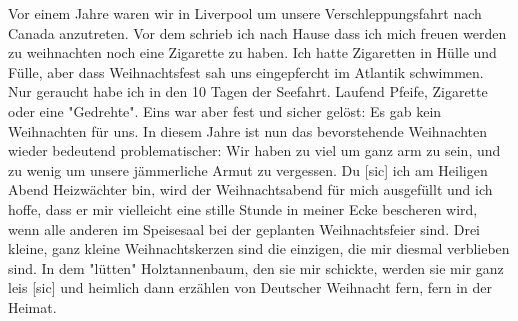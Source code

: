 \def\day{22. 12. 1942. *}
\mktitle

Vor einem Jahre waren wir in Liverpool um unsere Verschleppungsfahrt nach Canada anzutreten.
Vor dem schrieb ich nach Hause dass ich mich freuen werden zu weihnachten noch eine Zigarette zu haben.
Ich hatte Zigaretten in H\"{u}lle und F\"{u}lle, aber dass Weihnachtsfest sah uns eingepfercht im Atlantik schwimmen.
Nur geraucht habe ich in den 10 Tagen der Seefahrt.
Laufend Pfeife, Zigarette oder eine "Gedrehte".
Eins war aber fest und sicher gel\"{o}st: Es gab kein Weihnachten f\"{u}r uns.
In diesem Jahre ist nun das bevorstehende Weihnachten wieder bedeutend problematischer: Wir haben zu viel um ganz arm zu sein, und zu wenig um unsere j\"{a}mmerliche Armut zu vergessen.
Du{\color{red} [sic] } ich am Heiligen Abend Heizw\"{a}chter bin, wird der Weihnachtsabend f\"{u}r mich ausgef\"{u}llt und ich hoffe, dass er mir vielleicht eine stille Stunde in meiner Ecke bescheren wird, wenn alle anderen im Speisesaal bei der geplanten Weihnachtsfeier sind.
Drei kleine, ganz kleine Weihnachtskerzen sind die einzigen, die mir diesmal verblieben sind.
In dem "l\"{u}tten" Holztannenbaum, den sie mir schickte, werden sie mir ganz leis{\color{red} [sic] } und heimlich dann erz\"{a}hlen von Deutscher Weihnacht fern, fern in der Heimat.

\clearpage
